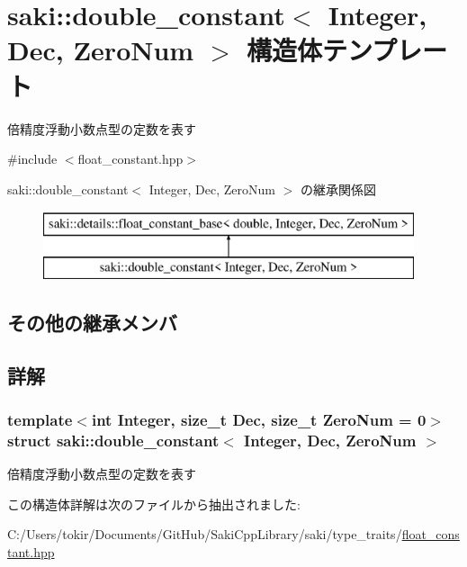 \hypertarget{structsaki_1_1double__constant}{}\section{saki\+:\+:double\+\_\+constant$<$ Integer, Dec, Zero\+Num $>$ 構造体テンプレート}
\label{structsaki_1_1double__constant}


倍精度浮動小数点型の定数を表す  




{\ttfamily \#include $<$float\+\_\+constant.\+hpp$>$}

saki\+:\+:double\+\_\+constant$<$ Integer, Dec, Zero\+Num $>$ の継承関係図\begin{figure}[H]
\begin{center}
\leavevmode
\includegraphics[height=2.000000cm]{structsaki_1_1double__constant}
\end{center}
\end{figure}
\subsection*{その他の継承メンバ}


\subsection{詳解}
\subsubsection*{template$<$int Integer, size\+\_\+t Dec, size\+\_\+t Zero\+Num = 0$>$\newline
struct saki\+::double\+\_\+constant$<$ Integer, Dec, Zero\+Num $>$}

倍精度浮動小数点型の定数を表す 

この構造体詳解は次のファイルから抽出されました\+:\begin{DoxyCompactItemize}
\item 
C\+:/\+Users/tokir/\+Documents/\+Git\+Hub/\+Saki\+Cpp\+Library/saki/type\+\_\+traits/\mbox{\hyperlink{float__constant_8hpp}{float\+\_\+constant.\+hpp}}\end{DoxyCompactItemize}
